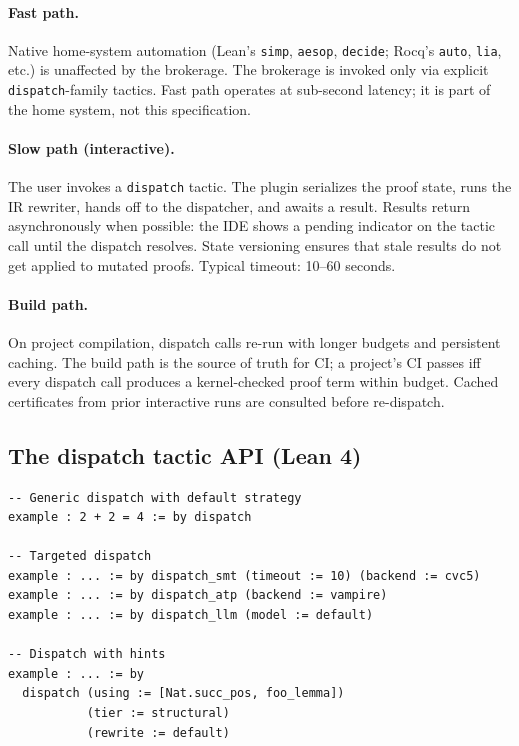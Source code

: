 \documentclass[11pt,letterpaper]{article}
\theoremstyle{definition}
\theoremstyle{remark}
\begin{document}
\paragraph{Fast path.} Native home-system automation (Lean's
\texttt{simp}, \texttt{aesop}, \texttt{decide}; Rocq's \texttt{auto},
\texttt{lia}, etc.) is unaffected by the brokerage. The brokerage is
invoked only via explicit \texttt{dispatch}-family tactics. Fast path
operates at sub-second latency; it is part of the home system, not
this specification.

\paragraph{Slow path (interactive).} The user invokes a
\texttt{dispatch} tactic. The plugin serializes the proof state, runs
the IR rewriter, hands off to the dispatcher, and awaits a result.
Results return asynchronously when possible: the IDE shows a pending
indicator on the tactic call until the dispatch resolves. State
versioning ensures that stale results do not get applied to mutated
proofs. Typical timeout: 10--60 seconds.

\paragraph{Build path.} On project compilation, dispatch calls re-run
with longer budgets and persistent caching. The build path is the
source of truth for CI; a project's CI passes iff every dispatch call
produces a kernel-checked proof term within budget. Cached certificates
from prior interactive runs are consulted before re-dispatch.

\subsection{The dispatch tactic API (Lean 4)}

\begin{lstlisting}[style=lean]
-- Generic dispatch with default strategy
example : 2 + 2 = 4 := by dispatch

-- Targeted dispatch
example : ... := by dispatch_smt (timeout := 10) (backend := cvc5)
example : ... := by dispatch_atp (backend := vampire)
example : ... := by dispatch_llm (model := default)

-- Dispatch with hints
example : ... := by
  dispatch (using := [Nat.succ_pos, foo_lemma])
           (tier := structural)
           (rewrite := default)
\end{lstlisting}
\end{document}
